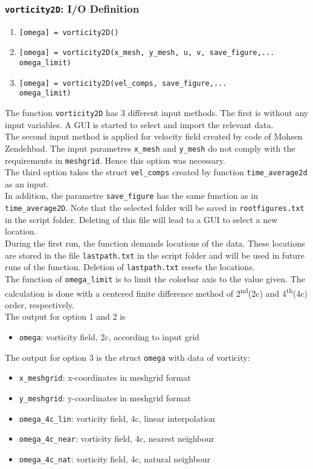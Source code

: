 \documentclass[
12pt,
a4paper,
twoside]
{article}
\begin{document}
\subsubsection{\texttt{vorticity2D}: I/O Definition}
\begin{enumerate}
\item \verb![omega] = vorticity2D()!
\item \verb![omega] = vorticity2D(x_mesh, y_mesh, u, v, save_figure,...!\\ \verb!omega_limit)!
\item \verb![omega] = vorticity2D(vel_comps, save_figure,...!\\ \verb!omega_limit)!
\end{enumerate}
The function \texttt{vorticity2D} has 3 different input methods. The first is without any input variables. A GUI is started to select and import the relevant data.\\
The second input method is applied for velocity field created by code of Mohsen Zendehbad. The input parametres \verb!x_mesh! and \verb!y_mesh! do not comply with the requirements in \verb!meshgrid!. Hence this option was necessary.\\
The third option takes the struct \verb!vel_comps! created by function \verb!time_average2d! as an input.\\
In addition, the parametre \verb!save_figure! has the same function as in \verb!time_average2D!. Note that the selected folder will be saved in \verb!rootfigures.txt! in the script folder. Deleting of this file will lead to a GUI to select a new location.\\
During the first run, the function demands locations of the data. These locations are stored in the file \verb!lastpath.txt! in the script folder and will be used in future runs of the function. Deletion of \verb!lastpath.txt! resets the locations.\\
The function of \verb!omega_limit! is to limit the colorbar axis to the value given.
The calculation is done with a centered finite difference method of 2\textsuperscript{nd}(2c) and 4\textsuperscript{th}(4c) order, respectively.\\
The output for option 1 and 2 is
\begin{itemize}
\item \verb!omega!:  vorticity field, 2c, according to input grid
\end{itemize}
The output for option 3 is the struct \verb!omega! with data of vorticity:
\begin{itemize}
\item \verb!x_meshgrid!: x-coordinates in meshgrid format
\item \verb!y_meshgrid!: y-coordinates in meshgrid format
\item \verb!omega_4c_lin!: vorticity field, 4c, linear interpolation
\item \verb!omega_4c_near!: vorticity field, 4c, nearest neighbour
\item \verb!omega_4c_nat!: vorticity field, 4c, natural neighbour
\end{itemize}
\end{document}

